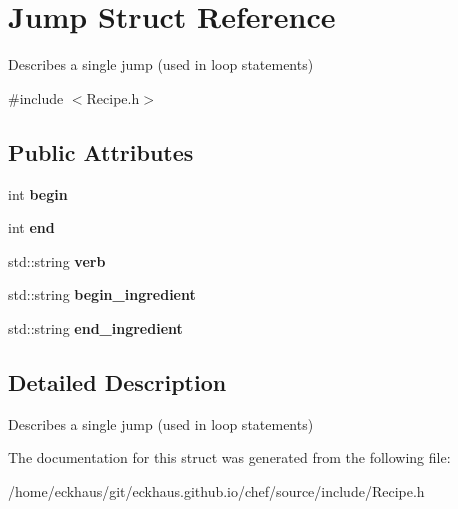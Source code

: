 \hypertarget{structJump}{\section{Jump Struct Reference}
\label{structJump}
}


Describes a single jump (used in loop statements)  




{\ttfamily \#include $<$Recipe.\-h$>$}

\subsection*{Public Attributes}
\begin{DoxyCompactItemize}
\item 
\hypertarget{structJump_aacc2efa25696a52f6f61f62267ab2f47}{int {\bfseries begin}}\label{structJump_aacc2efa25696a52f6f61f62267ab2f47}

\item 
\hypertarget{structJump_aa71cf756358c686638ffc89fa770d479}{int {\bfseries end}}\label{structJump_aa71cf756358c686638ffc89fa770d479}

\item 
\hypertarget{structJump_aadb1772c185751d9680fa940a1b70ff0}{std\-::string {\bfseries verb}}\label{structJump_aadb1772c185751d9680fa940a1b70ff0}

\item 
\hypertarget{structJump_a3460b8e21e016ce3f1d1e46b6df502e4}{std\-::string {\bfseries begin\-\_\-ingredient}}\label{structJump_a3460b8e21e016ce3f1d1e46b6df502e4}

\item 
\hypertarget{structJump_a8f8c276a637d06f807e5417f0d40b418}{std\-::string {\bfseries end\-\_\-ingredient}}\label{structJump_a8f8c276a637d06f807e5417f0d40b418}

\end{DoxyCompactItemize}


\subsection{Detailed Description}
Describes a single jump (used in loop statements) 

The documentation for this struct was generated from the following file\-:\begin{DoxyCompactItemize}
\item 
/home/eckhaus/git/eckhaus.\-github.\-io/chef/source/include/Recipe.\-h\end{DoxyCompactItemize}
